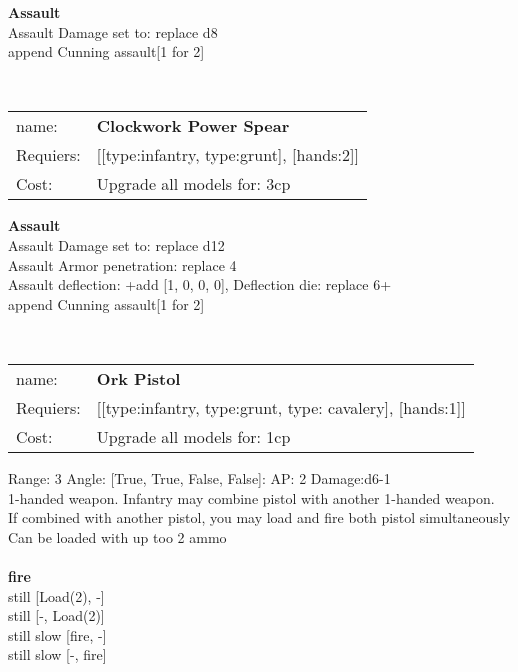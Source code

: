 {\bf Assault} \ \\
Assault Damage set to: replace d8
\\ 

append Cunning assault[1 for 2]


\ \\
\begin{tabular}{ll}
name: & {\bf Clockwork Power Spear } \\
Requiers: & [[type:infantry, type:grunt], [hands:2]] \\
Cost: & Upgrade all models for: 3cp \\
\end{tabular}





{\bf Assault} \ \\
Assault Damage set to: replace d12
\\ 
Assault Armor penetration: replace 4 
\\ 
Assault deflection: +add [1, 0, 0, 0], Deflection die: replace 6+
\\ 

append Cunning assault[1 for 2]


\ \\
\begin{tabular}{ll}
name: & {\bf Ork Pistol } \\
Requiers: & [[type:infantry, type:grunt, type: cavalery], [hands:1]] \\
Cost: & Upgrade all models for: 1cp \\
\end{tabular}



Range: 3  Angle: [True, True, False, False]: AP: 2 Damage:d6-1 \\
1-handed weapon. Infantry may combine pistol with another 1-handed weapon.\\ 
If combined with another pistol, you may load and fire both pistol simultaneously\\ 
Can be loaded with up too 2 ammo\\ 







\ \\ {\bf fire } \\
still [Load(2), -] \\
still [-, Load(2)] \\
still slow [fire, -] \\
still slow [-, fire] \\

